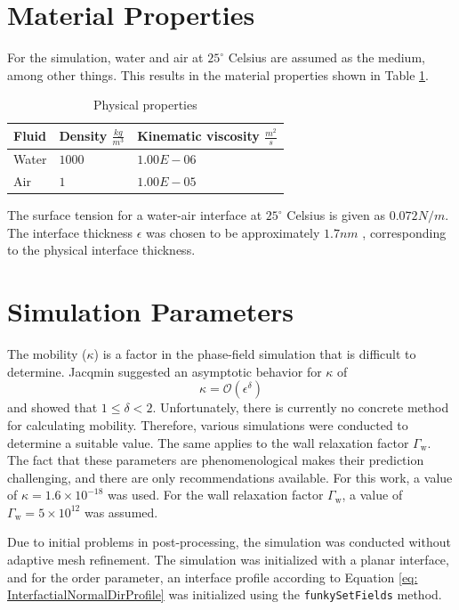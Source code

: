 \section{Material Properties}
For the simulation, water and air at $25^{\circ}$ Celsius are assumed as the medium, among other things. This results in the material properties shown in Table \ref{tab:physicalProperties_CaseSetup}.
\begin{table}[h]
    \centering
    \caption{Physical properties}
    \label{tab:physicalProperties_CaseSetup}
    \begin{tabular}{lll}
        Fluid & Density $\frac{kg}{m^3}$ & Kinematic viscosity $\frac{m^2}{s}$ \\ \hline
        Water & $1000$ & $1.00E-06$ \\
        Air & $1$ & $1.00E-05$ \\
    \end{tabular}
\end{table}
The surface tension for a water-air interface at $25^{\circ}$ Celsius is given as \(0.072 N/m\). The interface thickness \( \epsilon \) was chosen to be approximately \(1.7 nm\) \cite{bagheriInterfacialRelaxationCrucial2022}, corresponding to the physical interface thickness.


\section{Simulation Parameters}
The mobility ($\kappa$) is a factor in the phase-field simulation that is difficult to determine. Jacqmin \cite{jacqmin1999CalculationTwoPhaseNavier} suggested an asymptotic behavior for \( \kappa \) of 
\begin{equation}
    \kappa = \mathcal{O}(\epsilon^{\delta})
\end{equation}
and showed that \( 1 \leq \delta < 2 \). Unfortunately, there is currently no concrete method for calculating mobility. Therefore, various simulations were conducted to determine a suitable value. The same applies to the wall relaxation factor $\Gamma_{\mathrm{w}}$. The fact that these parameters are phenomenological makes their prediction challenging, and there are only recommendations available.
For this work, a value of \( \kappa = 1.6 \times 10^{-18} \) was used. For the wall relaxation factor $\Gamma_{\mathrm{w}}$, a value of \( \Gamma_{\mathrm{w}} = 5 \times 10^{12} \) was assumed. 

Due to initial problems in post-processing, the simulation was conducted without adaptive mesh refinement.
The simulation was initialized with a planar interface, and for the order parameter, an interface profile according to Equation \ref{eq: InterfactialNormalDirProfile} was initialized using the \texttt{funkySetFields} method.

